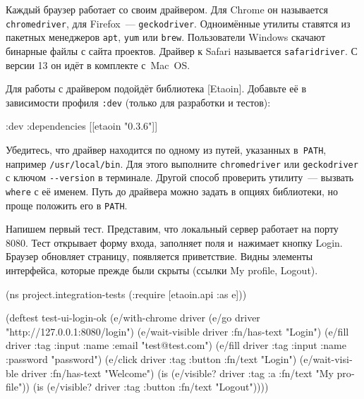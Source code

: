 
Каждый браузер работает со своим драйвером. Для Chrome он называется
\verb|chromedriver|, для Firefox~--- \verb|geckodriver|. Одноимённые утилиты
ставятся из пакетных менеджеров \verb|apt|, \verb|yum| или
\verb|brew|. Пользователи Windows скачают бинарные файлы с сайта
проектов. Драйвер к Safari называется \verb|safaridriver|. С версии 13 он
идёт в комплекте с~Mac~OS.


Для работы с драйвером подойдёт библиотека [Etaoin].
Добавьте её в зависимости профиля \verb|:dev| (только для разработки и тестов):

\begin{english}
  \begin{clojure}
:dev {:dependencies [[etaoin "0.3.6"]]}
  \end{clojure}
\end{english}

Убедитесь, что драйвер находится по одному из путей, указанных в~\verb|PATH|,
например \verb|/usr/local/bin|. Для этого выполните \texttt{chrome\-driver} или
\verb|geckodriver| с ключом \verb|--version| в терминале. Другой способ
проверить утилиту~--- вызвать \verb|where| с её именем. Путь до драйвера можно
задать в опциях библиотеки, но проще положить его в \verb|PATH|.


Напишем первый тест. Представим, что локальный сервер работает на порту
8080. Тест открывает форму входа, заполняет поля и~нажимает кнопку
Login. Браузер обновляет страницу, появляется приветствие. Видны элементы
интерфейса, которые прежде были скрыты (ссылки My profile, Logout).


\ifx\DEVICETYPE\MOBILE

\begin{english}
  \begin{clojure}
(ns project.integration-tests
  (:require [etaoin.api :as e]))

(deftest test-ui-login-ok
  (e/with-chrome {} driver
    (e/go driver
      "http://127.0.0.1:8080/login")
    (e/wait-visible driver
      {:fn/has-text "Login"})
    (e/fill driver
      {:tag :input :name :email}
      "test@test.com")
    (e/fill driver
      {:tag :input :name :password}
      "password")
    (e/click driver
      {:tag :button :fn/text "Login"})
    (e/wait-visible driver
      {:fn/has-text "Welcome"})
    (is (e/visible? driver
          {:tag :a
           :fn/text "My profile"}))
    (is (e/visible? driver
          {:tag :button
           :fn/text "Logout"}))))
  \end{clojure}
\end{english}

